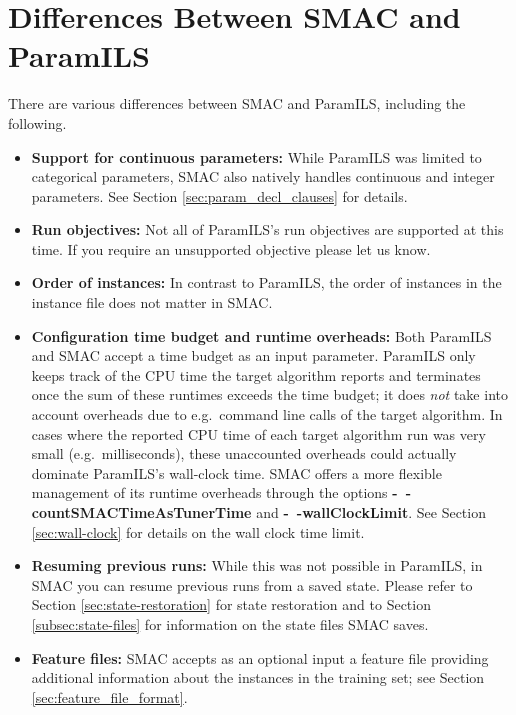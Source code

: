 \section{Differences Between SMAC and ParamILS}

There are various differences between SMAC and ParamILS, including the following.

\begin{itemize}
\item \textbf{Support for continuous parameters:} 
While ParamILS was limited to categorical parameters, SMAC also natively handles continuous and integer parameters. See Section \ref{sec:param_decl_clauses} for details.

\item \textbf{Run objectives:} 
Not all of ParamILS's run objectives are supported at this time. If you require an unsupported objective please let us know.

\item \textbf{Order of instances:} 
In contrast to ParamILS, the order of instances in the instance file does not matter in SMAC.

\item \textbf{Configuration time budget and runtime overheads:} 
Both ParamILS and SMAC accept a time budget as an input parameter. ParamILS only keeps track of the CPU time the target algorithm reports and terminates once the sum of these runtimes exceeds the time budget; it does \emph{not} take into account overheads due to e.g.\ command line calls of the target algorithm. In cases where the reported CPU time of each target algorithm run was very small (e.g.\ milliseconds), these unaccounted overheads could actually dominate ParamILS's wall-clock time.
SMAC offers a more flexible management of its runtime overheads through the options 
\textbf{-~$\!$-countSMACTimeAsTunerTime} and \textbf{-~$\!$-wallClockLimit}. See Section \ref{sec:wall-clock} for details on the wall clock time limit.

\item \textbf{Resuming previous runs:} 
While this was not possible in ParamILS, in SMAC you can resume previous runs from a saved state.
Please refer to Section \ref{sec:state-restoration} for state restoration and to Section \ref{subsec:state-files} for information on the state files SMAC saves.

\item \textbf{Feature files:} 
SMAC accepts as an optional input a feature file providing additional information about the instances in the training set; see Section \ref{sec:feature_file_format}.



\end{itemize}
